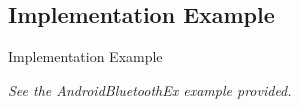 \documentclass{beamer}
\begin{document}
  \subsection{Implementation Example}
    \begin{frame}{Implementation Example}
      \begin{center}
        \emph{See the AndroidBluetoothEx example provided.}
      \end{center}
    \end{frame}

%
%
%
%
%
%
%
%
%
\end{document}
